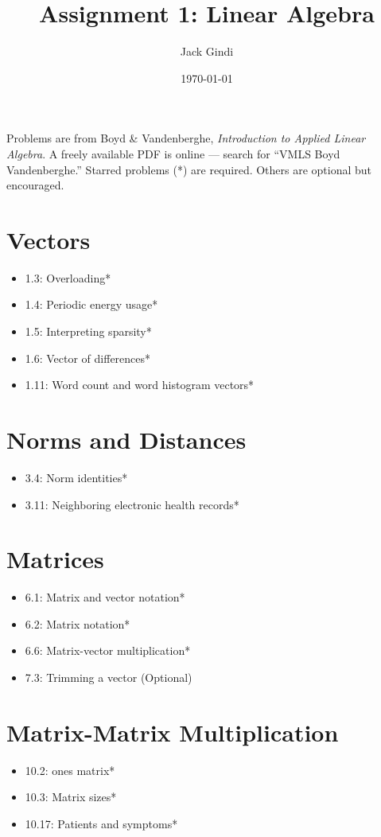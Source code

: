 \documentclass[12pt]{article}
\title{Assignment 1: Linear Algebra}
\author{Jack Gindi}
\date{\today}
\theoremstyle{definition}
\begin{document}
\maketitle

Problems are from Boyd \& Vandenberghe, \textit{Introduction to Applied Linear Algebra}.
A freely available PDF is online --- search for ``VMLS Boyd Vandenberghe.''
Starred problems (*) are required. Others are optional but encouraged.

\section{Vectors}
\begin{itemize}
    \item 1.3: Overloading*
    \item 1.4: Periodic energy usage*
    \item 1.5: Interpreting sparsity*
    \item 1.6: Vector of differences*
    \item 1.11: Word count and word histogram vectors*
\end{itemize}

\section{Norms and Distances}
\begin{itemize}
    \item 3.4: Norm identities*
    \item 3.11: Neighboring electronic health records*
\end{itemize}

\section{Matrices}
\begin{itemize}
    \item 6.1: Matrix and vector notation*
    \item 6.2: Matrix notation*
    \item 6.6: Matrix-vector multiplication*
    \item 7.3: Trimming a vector (Optional)
\end{itemize}

\section{Matrix-Matrix Multiplication}
\begin{itemize}
    \item 10.2: ones matrix*
    \item 10.3: Matrix sizes*
    \item 10.17: Patients and symptoms*
\end{itemize}
\end{document}
